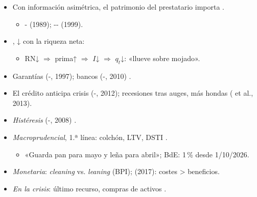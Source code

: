 \documentclass{article}
\begin{document}
\begin{columnas}
\begin{itemize}
\item Con información asimétrica, el patrimonio del prestatario importa .
  \begin{itemize}
  \item {}- (1989); -- (1999).
  \end{itemize}
\item {}, ↓ con la riqueza neta:
  \begin{itemize}
  \item RN↓ $\Rightarrow$ prima↑ $\Rightarrow$ $I$↓ $\Rightarrow$ $q_t$↓: «llueve sobre mojado».
  \end{itemize}
\end{itemize}
\begin{itemize}
\item Garantías (-, 1997); bancos (-, 2010) .
\item El crédito anticipa crisis (-, 2012); recesiones tras auges, más hondas ( et al., 2013).
\item \emph{Histéresis} (-, 2008) .
\end{itemize}
\begin{itemize}
\item \emph{Macroprudencial}, 1.ª línea: colchón, LTV, DSTI .
  \begin{itemize}
  \item «Guarda pan para mayo y leña para abril»; BdE: 1\,\% desde 1/10/2026.
  \end{itemize}
\item \emph{Monetaria}: \emph{cleaning} vs. \emph{leaning} (BPI);  (2017): costes > beneficios.
\item \emph{En la crisis}: último recurso, compras de activos .
\end{itemize}


\end{columnas}
\end{document}
